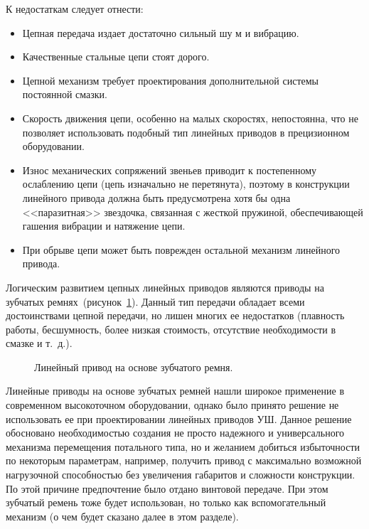 К недостаткам следует отнести:

\begin{itemize}
	\item Цепная передача издает достаточно сильный шу
	м и вибрацию.
	
	\item Качественные стальные цепи стоят дорого.
	
	\item Цепной механизм требует проектирования дополнительной системы постоянной смазки.
	
	\item Скорость движения цепи, особенно на малых скоростях, непостоянна, что не позволяет использовать подобный тип линейных приводов в прецизионном оборудовании.
	
	\item Износ механических сопряжений звеньев приводит к постепенному ослаблению цепи (цепь изначально не перетянута), поэтому в конструкции линейного привода должна быть предусмотрена хотя бы одна <<паразитная>> звездочка, связанная с жесткой пружиной, обеспечивающей гашения вибрации и натяжение цепи.
	
	\item При обрыве цепи может быть поврежден остальной механизм линейного привода.
\end{itemize}

Логическим развитием цепных линейных приводов являются приводы на зубчатых ремнях~(рисунок~\cref{fig:belt}). Данный тип передачи обладает всеми достоинствами цепной передачи, но лишен многих ее недостатков (плавность работы, бесшумность, более низкая стоимость, отсутствие необходимости в смазке и т.~д.). 

\begin{figure}[ht]
	\caption{Линейный привод на основе зубчатого ремня.}\label{fig:belt}
\end{figure}

Линейные приводы на основе зубчатых ремней нашли широкое применение в современном высокоточном оборудовании, однако было принято решение не использовать ее при проектировании линейных приводов УШ. Данное решение обосновано необходимостью создания не просто надежного и универсального механизма перемещения потального типа, но и желанием добиться избыточности по некоторым параметрам, например, получить привод с максимально возможной нагрузочной способностью без увеличения габаритов и сложности конструкции. По этой причине предпочтение было отдано винтовой передаче. При этом зубчатый ремень тоже будет использован, но только как вспомогательный механизм (о чем будет сказано далее в этом разделе).

